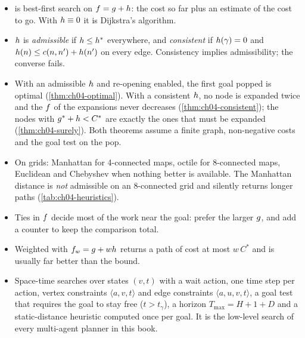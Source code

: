\begin{summary}
\begin{itemize}
  \item \astar is best-first search on $f = g + h$: the cost so
        far plus an estimate of the cost to go. With $h \equiv 0$ it is
        Dijkstra's algorithm.
  \item $h$ is \emph{admissible} if $h \le h^*$ everywhere, and
        \emph{consistent} if $h(\gamma) = 0$ and $h(n) \le c(n,n') +
        h(n')$ on every edge. Consistency implies admissibility; the
        converse fails.
  \item With an admissible $h$ and re-opening enabled, the first goal
        popped is optimal (\cref{thm:ch04-optimal}). With a consistent $h$,
        no node is expanded twice and the $f$ of the expansions never
        decreases (\cref{thm:ch04-consistent}); the nodes with $g^* +
        h < C^*$ are exactly the ones that must be expanded
        (\cref{thm:ch04-surely}). Both theorems assume a finite graph,
        non-negative costs and the goal test on the pop.
  \item On grids: Manhattan for 4-connected maps, octile for 8-connected maps,
        Euclidean and Chebyshev when nothing better is available. The Manhattan
        distance is \emph{not} admissible on an 8-connected grid and silently
        returns longer paths (\cref{tab:ch04-heuristics}).
  \item Ties in $f$ decide most of the work near the goal: prefer the
        larger $g$, and add a counter to keep the comparison total.
  \item Weighted \astar with $f_w = g + wh$ returns a path of cost
        at most $w\,C^*$ and is usually far better than the bound.
  \item Space-time \astar searches over states $(v, t)$ with a wait action, one
        time step per action, vertex constraints $\langle a,v,t\rangle$ and edge
        constraints $\langle a,u,v,t\rangle$, a goal test that requires the goal
        to stay free ($t > t_\gamma$), a horizon $T_{\max} = H + 1 + D$ and a
        static-distance heuristic computed once per goal. It is the low-level
        search of every multi-agent planner in this book.
\end{itemize}
\end{summary}

